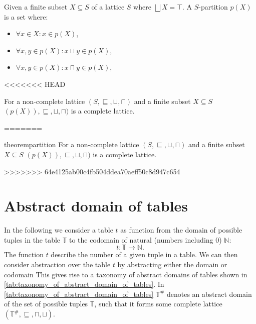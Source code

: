 
\begin{definition}
    Given a finite subset $X \subseteq S$ of a lattice $S$ where $\bigsqcup X = \top$.
    A $S$-partition $p(X)$ is a set where:
    \begin{itemize}
        \item $\forall x \in X: x \in p(X)$,
        \item $\forall x, y \in p(X) : x \sqcup y \in p(X)$,
        \item $\forall x, y \in p(X) : x \sqcap y \in p(X)$,
    \end{itemize}
\end{definition}

<<<<<<< HEAD
\begin{theorem}
    For a non-complete lattice $(S, \sqsubseteq, \sqcup, \sqcap)$ and a finite subset $X \subseteq S$ $(p(X)), \sqsubseteq, \sqcup, \sqcap)$ is a complete lattice.
\end{theorem}
=======
\begin{restatable}{theorem}{partition}\label{thm:partition}
    For a non-complete lattice $(S, \sqsubseteq, \sqcup, \sqcap)$ and a finite subset $X \subseteq S$ $(p(X)), \sqsubseteq, \sqcup, \sqcap)$ is a complete lattice.
\end{restatable}
>>>>>>> 64e4125ab00c4fb504ddea70aeff50c8d947c654

\section{Abstract domain of tables}\label{sec:abstract_domain_of_tables}

In the following we consider a table $t$ as function from the domain of possible tuples in the table $\mathbb{T}$ to the codomain of natural (numbers including $0$) $\mathbb{N}$:
\begin{equation}
    t : \mathbb{T} \rightarrow \mathbb{N}.
\end{equation}
The function $t$ describe the number of a given tuple in a table.
We can then consider abstraction over the table $t$ by abstracting either the domain or codomain
This gives rise to a taxonomy of abstract domains of tables shown in \autoref{tab:taxonomy_of_abstract_domain_of_tables}.
In \autoref{tab:taxonomy_of_abstract_domain_of_tables} $\mathbb{T}^\#$ denotes an abstract domain of the set of possible tuples $\mathbb{T}$, such that it forms some complete lattice $(\mathbb{T}^\#, \sqsubseteq, \sqcap, \sqcup)$.

